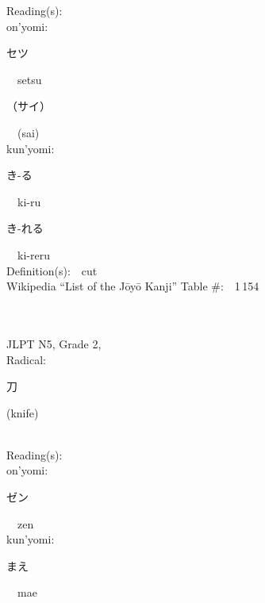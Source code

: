 \begin{multicols}{2}
Reading(s):\ \ \\
{\hspace*{1em}}on'yomi:\ \ \\
{\hspace*{2em}}{\begin{CJK}{UTF8}{min} セツ \end{CJK}}\ \ setsu\ \ \\
{\hspace*{2em}}{\begin{CJK}{UTF8}{min} （サイ） \end{CJK}}\ \ (sai)\ \ \\
{\hspace*{1em}}kun'yomi:\ \ \\
{\hspace*{2em}}{\begin{CJK}{UTF8}{min} き-る \end{CJK}}\ \ ki-ru\ \ \\
{\hspace*{2em}}{\begin{CJK}{UTF8}{min} き-れる \end{CJK}}\ \ ki-reru\ \ \\
Definition(s):\ \ cut \\
Wikipedia ``List of the J\=oy\=o Kanji'' Table \#:\ \ 1\,154 \\
\ \ \\
{\fontsize{34pt}{40pt}  }\ \ \\  %
{JLPT N5, Grade 2, \\Radical:\ \ {\begin{CJK}{UTF8}{min} 刀 \end{CJK}} (knife) } \\
Reading(s):\ \ \\
{\hspace*{1em}}on'yomi:\ \ \\
{\hspace*{2em}}{\begin{CJK}{UTF8}{min} ゼン \end{CJK}}\ \ zen\ \ \\
{\hspace*{1em}}kun'yomi:\ \ \\
{\hspace*{2em}}{\begin{CJK}{UTF8}{min} まえ \end{CJK}}\ \ mae\ \ \\

\end{multicols}
